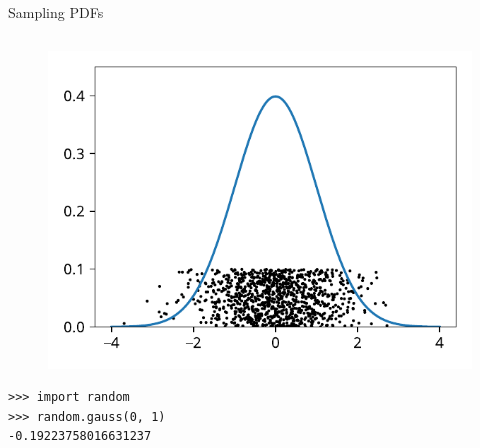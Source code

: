\documentclass[12pt, aspectratio=149]{beamer}
\theoremstyle{plain}
\begin{document}
\begin{frame}[fragile]{Sampling PDFs}
\begin{columns}
\begin{column}{0.5\textwidth}
\begin{center}
\begin{figure}
     	\includegraphics[width=0.99\linewidth]{figures/normal_samples}
     \end{figure}
      \begin{verbatim}
>>> import random
>>> random.gauss(0, 1)
-0.19223758016631237
      \end{verbatim}
     \end{center}
\end{column}
\end{columns}
\end{frame}
\end{document}
